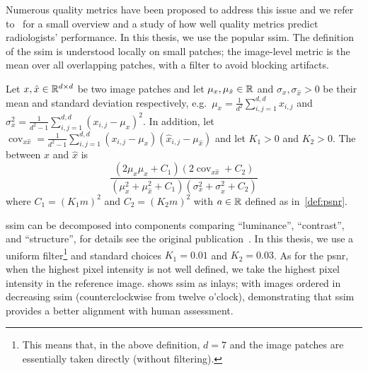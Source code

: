 Numerous quality metrics have been proposed to address this issue and we refer to~\cite{mason_imagequality_2020} for a small overview and a study of how well quality metrics predict radiologists' performance.
In this thesis, we use the popular \gls{ssim}.
The definition of the \gls{ssim} is understood locally on small patches; the image-level metric is the mean over all overlapping patches, with a filter to avoid blocking artifacts.
\begin{definition}%
	\label{def:ssim}
	Let \( x, \hat{x} \in \mathbb{R}^{d \times d} \) be two image patches and let \( \mu_{x}, \mu_{\hat{x}} \in \mathbb{R} \) and \( \sigma_x, \sigma_{\hat{x}} > \num{0} \) be their mean and standard deviation respectively, e.g.\ \( \mu_{x} = \tfrac{1}{d^{\num{2}}} \sum_{i,j=\num{1}}^{d,d} x_{i,j} \) and \( \sigma_x^{\num{2}} = \frac{1}{d^{\num{2}}-\num{1}} \sum_{i,j=\num{1}}^{d,d} (x_{i,j} - \mu_x)^{\num{2}} \).
	In addition, let \( \operatorname{cov}_{x\hat{x}} = \frac{1}{d^{\num{2}}-1} \sum_{i,j=\num{1}}^{d,d} (x_{i,j}- \mu_x)(\hat{x}_{i,j} - \mu_{\hat{x}}) \) and let \( K_{\num{1}} > \num{0} \) and \( K_{\num{2}} > \num{0} \).
	The \emph{} between \( x \) and \( \hat{x} \) is
	\begin{equation}
		\frac{(\num{2}\mu_x\mu_{\hat{x}} + C_{\num{1}})(\num{2}\operatorname{cov}_{x\hat{x}} + C_{\num{2}})}{(\mu_x^{\num{2}}+\mu_{\hat{x}}^{\num{2}} + C_{\num{1}})(\sigma_x^{\num{2}} + \sigma_{\hat{x}}^{\num{2}} + C_{\num{2}})}
	\end{equation}
	where \( C_{\num{1}} = (K_{\num{1}}m)^{\num{2}} \) and \( C_{\num{2}} = (K_{\num{2}}m)^{\num{2}} \) with \( a \in \mathbb{R} \) defined as in~\cref{def:psnr}.
\end{definition}

\Gls{ssim} can be decomposed into components comparing \enquote{luminance}, \enquote{contrast}, and \enquote{structure}, for details see the original publication~\cite{wang_ssim_2004}.
In this thesis, we use a  uniform filter\footnote{%
	This means that, in the above definition, \( d = \num{7} \) and the image patches are essentially taken directly (without filtering).%
} and standard choices \( K_{\num{1}} = \num{0.01} \) and \( K_{\num{2}} = \num{0.03} \).
As for the \gls{psnr}, when the highest pixel intensity is not well defined, we take the highest pixel intensity in the reference image.
 shows \gls{ssim} as inlays; with images ordered in decreasing \gls{ssim} (counterclockwise from twelve o'clock), demonstrating that \gls{ssim} provides a better alignment with human assessment.
